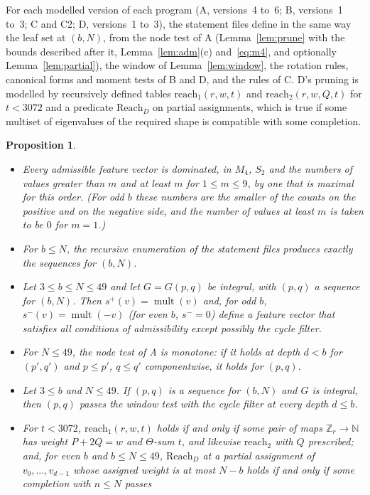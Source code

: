 \documentclass[11pt]{article}
\newtheorem{proposition}[lemma]{Proposition}
\theoremstyle{definition}
\theoremstyle{remark}
\DeclareMathOperator{\mult}{mult}
\newcommand{\Z}{\mathbb Z}
\begin{document}
For each modelled version of each program (A, versions~4 to~6; B, versions~1
to~3; C and C2; D, versions~1 to~3), the statement files define in the same
way the leaf set at $(b,N)$, from the node test of A (Lemma~\ref{lem:prune}
with the bounds described after it, Lemma~\ref{lem:adm}(c) and~\eqref{eq:m4},
and optionally Lemma~\ref{lem:partial}), the window of
Lemma~\ref{lem:window}, the rotation rules, canonical forms and moment tests
of B and D, and the rules of C. D's pruning is modelled by recursively defined
tables $\mathrm{reach}_1(r,w,t)$ and $\mathrm{reach}_2(r,w,Q,t)$ for $t<3072$
and a predicate $\mathrm{Reach}_D$ on partial assignments, which is true if
some multiset of eigenvalues of the required shape is compatible with some
completion.

\begin{proposition}\label{prop:pruning}
\begin{itemize}
\item[(a)] Every admissible feature vector is dominated, in $M_4$, $S_2$ and
 the numbers of values greater than $m$ and at least $m$ for $1\le m\le9$, by
 one that is maximal for this order. (For odd $b$ these numbers are the
 smaller of the counts on the positive and on the negative side, and the
 number of values at least $m$ is taken to be $0$ for $m=1$.)
\item[(b)] For $b\le N$, the recursive enumeration of the statement files
 produces exactly the sequences for $(b,N)$.
\item[(c)] Let $3\le b\le N\le49$ and let $G=G(p,q)$ be integral, with $(p,q)$ a
 sequence for $(b,N)$. Then $s^+(v)=\mult(v)$ and, for odd $b$,
 $s^-(v)=\mult(-v)$ (for even $b$, $s^-=0$) define a feature vector that
 satisfies all conditions of admissibility except possibly the cycle filter.
\item[(d)] For $N\le49$, the node test of A is monotone: if it holds at depth
 $d<b$ for
 $(p',q')$ and $p\le p'$, $q\le q'$ componentwise, it holds for $(p,q)$.
\item[(e)] Let $3\le b$ and $N\le49$. If $(p,q)$ is a sequence for $(b,N)$ and
 $G$ is integral, then $(p,q)$ passes the window test with the cycle filter at
 every depth $d\le b$.
\item[(f)] For $t<3072$, $\mathrm{reach}_1(r,w,t)$ holds if and only if some
 pair of maps $\Z_r\to\mathbb N$ has weight $P+2Q=w$ and $\Theta$-sum $t$, and
 likewise $\mathrm{reach}_2$ with $Q$ prescribed; and, for even $b$ and
 $b\le N\le49$, $\mathrm{Reach}_D$ at a partial assignment of
 $v_0,\dots,v_{d-1}$ whose assigned weight is at most $N-b$ holds if and only if some completion with $n\le N$ passes

\end{itemize}
\end{proposition}
\end{document}
